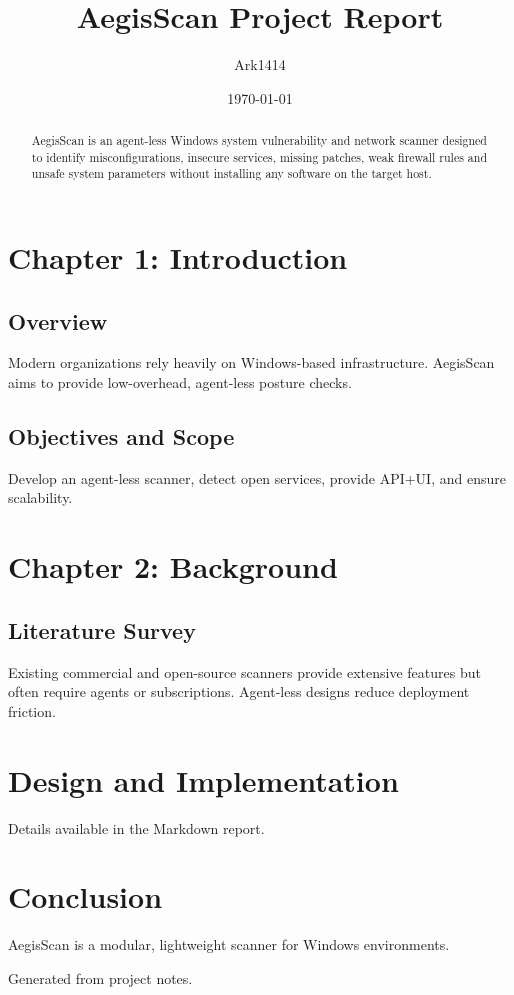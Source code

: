 \documentclass[11pt]{article}
\title{AegisScan Project Report}
\author{Ark1414}
\date{\today}
\begin{document}
\maketitle
\begin{abstract}
AegisScan is an agent-less Windows system vulnerability and network scanner designed to identify misconfigurations, insecure services, missing patches, weak firewall rules and unsafe system parameters without installing any software on the target host.
\end{abstract}

\section*{Chapter 1: Introduction}
\subsection*{Overview}
Modern organizations rely heavily on Windows-based infrastructure. AegisScan aims to provide low-overhead, agent-less posture checks.

\subsection*{Objectives and Scope}
Develop an agent-less scanner, detect open services, provide API+UI, and ensure scalability.

\section*{Chapter 2: Background}
\subsection*{Literature Survey}
Existing commercial and open-source scanners provide extensive features but often require agents or subscriptions. Agent-less designs reduce deployment friction.

\section*{Design and Implementation}
Details available in the Markdown report.

\section*{Conclusion}
AegisScan is a modular, lightweight scanner for Windows environments.

\vfill
\small{Generated from project notes.}
\end{document}
